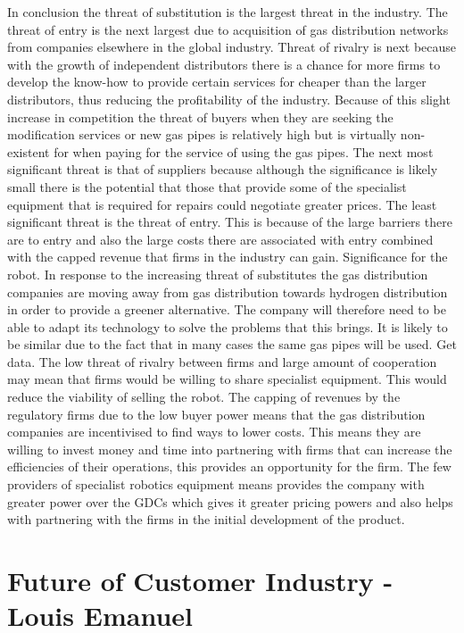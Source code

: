\documentclass[11pt]{article}		%
\begin{document}
                In conclusion the threat of substitution is the largest threat in the industry. The threat of entry is the next largest due to acquisition of gas distribution networks from companies elsewhere in the global industry.  Threat of rivalry is next because with the growth of independent distributors there is a chance for more firms to develop the know-how to provide certain services for cheaper than the larger distributors, thus reducing the profitability of the industry. Because of this slight increase in competition the threat of buyers when they are seeking the modification services or new gas pipes is relatively high but is virtually non-existent for when paying for the service of using the gas pipes. The next most significant threat is that of suppliers because although the significance is likely small there is the potential that those that provide some of the specialist equipment that is required for repairs could negotiate greater prices. The least significant threat is the threat of entry. This is because of the large barriers there are to entry and also the large costs there are associated with entry combined with the capped revenue that firms in the industry can gain.
                Significance for the robot.
                In response to the increasing threat of substitutes the gas distribution companies are moving away from gas distribution towards hydrogen distribution in order to provide a greener alternative. The company will therefore need to be able to adapt its technology to solve the problems that this brings. It is likely to be similar due to the fact that in many cases the same gas pipes will be used. Get data. 
                The low threat of rivalry between firms and large amount of cooperation may mean that firms would be willing to share specialist equipment. This would  reduce the viability of selling the robot. The capping of revenues by the regulatory firms due to the low buyer power means that the gas distribution companies are incentivised to find ways to lower costs. This means they are willing to invest money and time into partnering with firms that can increase the efficiencies of their operations, this provides an opportunity for the firm.
                The few providers of specialist robotics equipment means provides the company with greater power over the GDCs which gives it greater pricing powers and also helps with partnering with the firms in the initial development of the product.
        \section[Future of Customer Industry - EEM]{Future of Customer Industry - Louis Emanuel}
		
\end{document}
